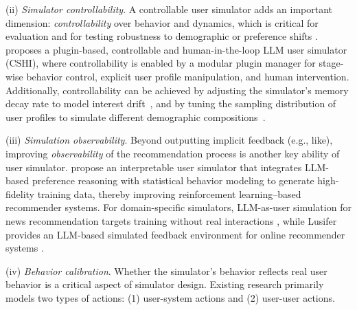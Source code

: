 (ii) \emph{Simulator controllability}. A controllable user simulator adds an important dimension: \emph{controllability} over behavior and dynamics, which is critical for evaluation and for testing robustness to demographic or preference shifts \cite{zhu2025llm,wei2025mirroring,zhu2024reliable}. 
\citet{zhu2025llm} proposes a plugin-based, controllable and human-in-the-loop LLM user simulator (CSHI), where controllability is enabled by a modular plugin manager for stage-wise behavior control, explicit user profile manipulation, and human intervention.
Additionally, controllability can be achieved by adjusting the simulator’s memory decay rate to model interest drift~\cite{wang2023recagent, ye2025creagent}, and by tuning the sampling distribution of user profiles to simulate different demographic compositions~\cite{ye2025creagent, zhang2024agent4rec}. 



(iii) \emph{Simulation observability}. Beyond outputting implicit feedback (e.g., like), improving \emph{observability} of the recommendation process is another key ability of user simulator. \citet{zhang2025llm} propose an interpretable user simulator that integrates LLM-based preference reasoning with statistical behavior modeling to generate high-fidelity training data, thereby improving reinforcement learning–based recommender systems.
For domain-specific simulators, LLM-as-user simulation for news recommendation targets training without real interactions \cite{park2025llm}, while Lusifer provides an LLM-based simulated feedback environment for online recommender systems \cite{ebrat2025lusifer}.

(iv) \textit{Behavior calibration}. 
Whether the simulator’s behavior reflects real user behavior is a critical aspect of simulator design. Existing research primarily models two types of actions: (1) user-system actions and (2) user-user actions.

